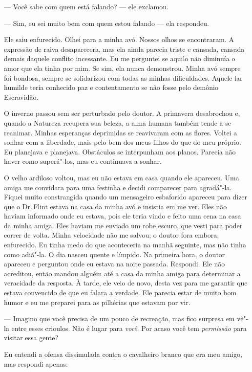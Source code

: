 --- Você sabe com quem está falando?
--- ele exclamou.

--- Sim, eu sei muito bem com quem
estou falando --- ela respondeu.

Ele saiu enfurecido. Olhei para a minha
avó. Nossos olhos se encontraram. A expressão de raiva desaparecera, mas
ela ainda parecia triste e cansada, cansada demais daquele conflito
incessante. Eu me perguntei se aquilo não diminuía o amor que ela tinha
por mim. Se sim, ela nunca demonstrou. Minha avó sempre foi bondosa,
sempre se solidarizou com todas as minhas dificuldades. Aquele lar
humilde teria conhecido paz e contentamento se não fosse pelo demônio
Escravidão.

O inverno passou sem ser perturbado
pelo doutor. A primavera desabrochou e, quando a Natureza recupera sua
beleza, a alma humana também tende a se reanimar. Minhas esperanças
deprimidas se reavivaram com as flores. Voltei a sonhar com a liberdade,
mais pelo bem dos meus filhos do que do meu próprio. Eu planejava e
planejava. Obstáculos se interpunham aos planos. Parecia não haver como
superá"-los, mas eu continuava a sonhar.

O velho ardiloso voltou, mas eu não
estava em casa quando ele apareceu. Uma amiga me convidara para uma
festinha e decidi comparecer para agradá"-la. Fiquei muito constrangida
quando um mensageiro esbaforido apareceu para dizer que o Dr.\,Flint
estava na casa da minha avó e insistia em me ver. Eles não haviam
informado onde eu estava, pois ele teria vindo e feito uma cena na casa
da minha amiga. Eles haviam me enviado um robe escuro, que vesti para
poder correr de volta. Minha velocidade não me salvou; o doutor fora
embora, enfurecido. Eu tinha medo do que aconteceria na manhã seguinte,
mas não tinha como adiá"-la. O dia nasceu quente e límpido. Na primeira
hora, o doutor apareceu e perguntou onde eu estava na noite passada.
Respondi. Ele não acreditou, então mandou alguém até a casa da minha
amiga para determinar a veracidade da resposta. À tarde, ele veio de
novo, desta vez para me garantir que estava convencido de que eu falara
a verdade. Ele parecia estar de muito bom humor e eu me preparei para as
pilhérias que estavam por vir.

--- Imagino que você precisa de um pouco de recreação, mas fico surpresa
em vê"-la entre esses crioulos. Não é lugar para \emph{você}. Por acaso
você tem \emph{permissão} para visitar essa gente?

Eu entendi a ofensa dissimulada contra
o cavalheiro branco que era meu amigo, mas respondi apenas:

